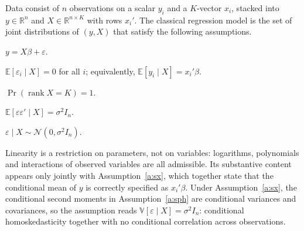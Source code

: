 \documentclass[11pt,a4paper]{article}
\newcommand{\E}{\mathbb{E}}
\newcommand{\V}{\mathbb{V}}
\newcommand{\R}{\mathbb{R}}
\newcommand{\N}{\mathcal{N}}
\newcommand{\rank}{\operatorname{rank}}
\begin{document}
Data consist of $n$ observations on a scalar $y_i$ and a $K$-vector $x_i$, stacked into $y\in\R^n$ and $X\in\R^{n\times K}$ with rows $x_i'$. The classical regression model is the set of joint distributions of $(y,X)$ that satisfy the following assumptions.

\begin{assumption}[Linearity]\label{a:lin}
$y = X\beta + \varepsilon$.
\end{assumption}

\begin{assumption}\label{a:sx}
$\E[\varepsilon_i\mid X] = 0$ for all $i$; equivalently, $\E[y_i\mid X]=x_i'\beta$.
\end{assumption}

\begin{assumption}\label{a:rank}
$\Pr(\rank X = K)=1$.
\end{assumption}

\begin{assumption}\label{a:sph}
$\E[\varepsilon\varepsilon'\mid X] = \sigma^2 I_n$.
\end{assumption}

\begin{assumption}[Normality]\label{a:norm}
$\varepsilon\mid X \sim \N(0,\sigma^2 I_n)$.
\end{assumption}

Linearity is a restriction on parameters, not on variables: logarithms, polynomials and interactions of observed variables are all admissible. Its substantive content appears only jointly with Assumption~\ref{a:sx}, which together state that the conditional mean of $y$ is correctly specified as $x_i'\beta$. Under Assumption~\ref{a:sx}, the conditional second moments in Assumption~\ref{a:sph} are conditional variances and covariances, so the assumption reads $\V[\varepsilon\mid X]=\sigma^2I_n$: conditional homoskedasticity together with no conditional correlation across observations.
\end{document}
